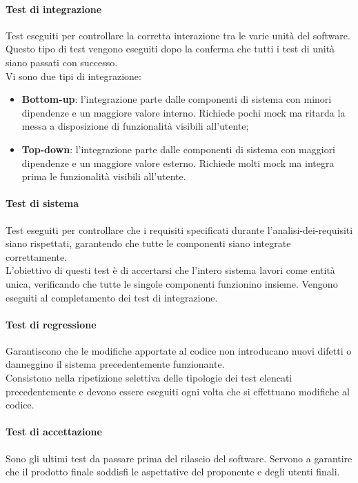 \documentclass[10pt]{article}
\begin{document}
\begin{justify}
    \paragraph{Test di integrazione}
    Test eseguiti per controllare la corretta interazione tra le varie unità del software. Questo tipo di test vengono eseguiti dopo la conferma che tutti i test di unità siano passati con successo.\\
    Vi sono due tipi di integrazione:
    \begin{itemize}
      \item \textbf{Bottom-up}: l'integrazione parte dalle componenti di sistema con minori dipendenze e un maggiore valore interno. Richiede pochi mock ma ritarda la messa a disposizione di funzionalità visibili all'utente;
      \item \textbf{Top-down}: l'integrazione parte dalle componenti di sistema con maggiori dipendenze e un maggiore valore esterno. Richiede molti mock ma integra prima le funzionalità visibili all'utente.
    \end{itemize}

    \paragraph{Test di sistema}
    Test eseguiti per controllare che i requisiti specificati durante l'analisi-dei-requisiti siano rispettati, garantendo che tutte le componenti siano integrate correttamente.\\
    L'obiettivo di questi test è di accertarsi che l'intero sistema lavori come entità unica, verificando che tutte le singole componenti funzionino insieme. Vengono eseguiti al completamento dei test di integrazione.

    \paragraph{Test di regressione}
    Garantiscono che le modifiche apportate al codice non introducano nuovi difetti o danneggino il sistema precedentemente funzionante.\\
    Consistono nella ripetizione selettiva delle tipologie dei test elencati precedentemente e devono essere eseguiti ogni volta che si effettuano modifiche al codice.

    \paragraph{Test di accettazione}
    Sono gli ultimi test da passare prima del rilascio del software. Servono a garantire che il prodotto finale soddisfi le aspettative del proponente e degli utenti finali.


\end{justify}
\end{document}
